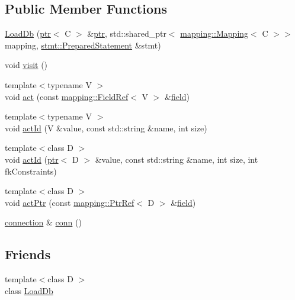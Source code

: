 \subsection*{Public Member Functions}
\begin{DoxyCompactItemize}
\item 
\hyperlink{classdbo_1_1action_1_1_load_db_a02817bb6d47c1ecb0d8757333e7bbafd}{Load\+Db} (\hyperlink{classdbo_1_1ptr}{ptr}$<$ C $>$ \&\hyperlink{classdbo_1_1ptr}{ptr}, std\+::shared\+\_\+ptr$<$ \hyperlink{classdbo_1_1mapping_1_1_mapping}{mapping\+::\+Mapping}$<$ C $>$$>$ mapping, \hyperlink{classdbo_1_1stmt_1_1_prepared_statement}{stmt\+::\+Prepared\+Statement} \&stmt)
\item 
void \hyperlink{classdbo_1_1action_1_1_load_db_a7855582f0e69485ec912d0c1f25679cd}{visit} ()
\item 
{\footnotesize template$<$typename V $>$ }\\void \hyperlink{classdbo_1_1action_1_1_load_db_adbc0f146c54ddd386718c86b6959712b}{act} (const \hyperlink{classdbo_1_1mapping_1_1_field_ref}{mapping\+::\+Field\+Ref}$<$ V $>$ \&\hyperlink{namespacedbo_ad1f50f02cb050acf946807959252a93f}{field})
\item 
{\footnotesize template$<$typename V $>$ }\\void \hyperlink{classdbo_1_1action_1_1_load_db_a404185ed719249af30c706eb8fffd140}{act\+Id} (V \&value, const std\+::string \&name, int size)
\item 
{\footnotesize template$<$class D $>$ }\\void \hyperlink{classdbo_1_1action_1_1_load_db_a4e7a6dc0ebc7a03cfbaa8efbd123b838}{act\+Id} (\hyperlink{classdbo_1_1ptr}{ptr}$<$ D $>$ \&value, const std\+::string \&name, int size, int fk\+Constraints)
\item 
{\footnotesize template$<$class D $>$ }\\void \hyperlink{classdbo_1_1action_1_1_load_db_ad3bcb9f15a436f52c6e8c740f7589c5e}{act\+Ptr} (const \hyperlink{classdbo_1_1mapping_1_1_ptr_ref}{mapping\+::\+Ptr\+Ref}$<$ D $>$ \&\hyperlink{namespacedbo_ad1f50f02cb050acf946807959252a93f}{field})
\item 
\hyperlink{classdbo_1_1connection}{connection} \& \hyperlink{classdbo_1_1action_1_1_load_db_a7c262008ee3d1e12b22ba405cd5a989b}{conn} ()
\end{DoxyCompactItemize}
\subsection*{Friends}
\begin{DoxyCompactItemize}
\item 
{\footnotesize template$<$class D $>$ }\\class \hyperlink{classdbo_1_1action_1_1_load_db_addf6451e303d1fec3fb0ffc370b29e81}{Load\+Db}
\end{DoxyCompactItemize}


